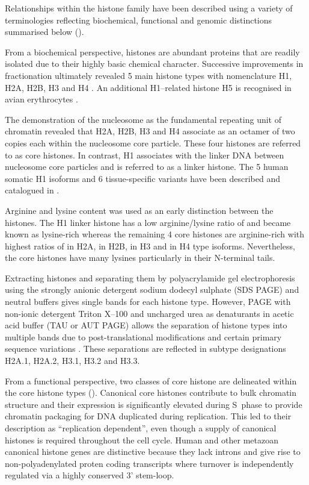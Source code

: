   Relationships within the histone family have been described using a variety of terminologies
  reflecting biochemical, functional and genomic distinctions summarised below ().
  
  From a biochemical perspective, histones are abundant proteins 
  that are readily isolated due to their highly basic chemical character. 
  Successive improvements in fractionation ultimately revealed 5 main histone types 
  with nomenclature H1, H2A, H2B, H3 and H4 \citep{nomenclature}.
  An additional H1--related histone H5 is recognised in avian erythrocytes \citep{HFive-review}.

  The demonstration of the nucleosome as the fundamental repeating unit of chromatin \citep{Kornberg1974} 
  revealed that H2A, H2B, H3 and H4 associate as an octamer of two copies each within the
  nucleosome core particle. These four histones are referred to as core histones. 
  In contrast, H1 associates with the linker DNA between nucleosome core particles 
  and is referred to as a linker histone. 
  The 5 human somatic H1 isoforms and 6 tissue-specific variants 
  have been described and catalogued in \citep{HarshmanFreitas2013}.

  Arginine and lysine content was used as an early distinction between the histones. 
  The H1 linker histone has a low arginine/lysine ratio of \LinkerArgLysRatio{} and became known as lysine-rich 
  whereas the remaining 4 core histones are arginine-rich 
  with highest ratios of \HTwoAArgLysRatio{} in H2A, \HTwoBArgLysRatio{} in H2B, 
  \HThreeArgLysRatio{} in H3 and \HFourArgLysRatio{} in H4 type isoforms.
  Nevertheless, the core histones have many lysines particularly in their N-terminal tails.

  Extracting histones and separating them by polyacrylamide gel electrophoresis 
  using the strongly anionic detergent sodium dodecyl sulphate (SDS PAGE) and neutral buffers 
  gives single bands for each histone type. 
  However, PAGE with non-ionic detergent Triton X--100 and uncharged urea as denaturants
  in acetic acid buffer (TAU or AUT PAGE) allows the separation of histone types into multiple bands 
  due to post-translational modifications and certain primary sequence variations \citep{PAGEND}. 
  These separations are reflected in subtype designations H2A.1, H2A.2, H3.1, H3.2 and H3.3. 

  From a functional perspective, two classes of core histone 
  are delineated within the core histone types ().
  Canonical core histones contribute to bulk chromatin structure and 
  their expression is significantly elevated during S~phase to provide chromatin packaging 
  for DNA duplicated during replication. This led to their description as ``replication dependent'', 
  even though a supply of canonical histones is required throughout the cell cycle. 
  Human and other metazoan canonical histone genes are distinctive 
  because they lack introns and give rise to non-polyadenylated proten coding transcripts 
  where turnover is independently regulated via a highly conserved 3' stem-loop.
  
